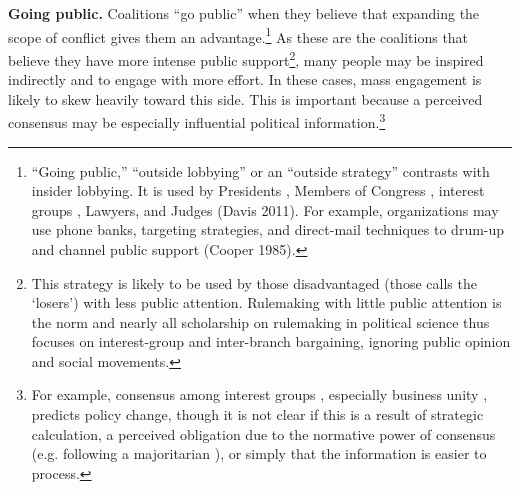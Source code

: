 \textbf{Going public.} Coalitions ``go public'' when they believe that expanding the scope of conflict gives them an advantage.\footnote{
``Going public,'' ``outside lobbying'' or an ``outside strategy'' contrasts with insider lobbying. It is used by Presidents \citep{Kernell2007}, Members of Congress \citep{Malecha2012}, interest groups \citep{Walker1991, Dur2013}, Lawyers, and Judges (Davis 2011). 
For example, organizations may use phone banks, targeting strategies, and direct-mail techniques to drum-up and channel public support (Cooper 1985).
}
As these are the coalitions that believe they have more intense public support\footnote{
This strategy is likely to be used by those disadvantaged (those \citet{Schattschneider1975} calls the `losers') with less public attention.
Rulemaking with little public attention is the norm and nearly all scholarship on rulemaking in political science thus focuses on interest-group and inter-branch bargaining, ignoring public opinion and social movements.}, many people may be inspired indirectly and to engage with more effort. In these cases, mass engagement is likely to skew heavily toward this side. This is important because a perceived consensus may be especially influential political information.\footnote{
For example, consensus among interest groups \citep{Golden1998, Yackee2006JPART}, especially business unity \citep{Yackee2006JOP, Haeder2015}, predicts policy change, though it is not clear if this is a result of strategic calculation, a perceived obligation due to the normative power of consensus (e.g. following a majoritarian \citep{Mendelson2011}), or simply that the information is easier to process.
}

